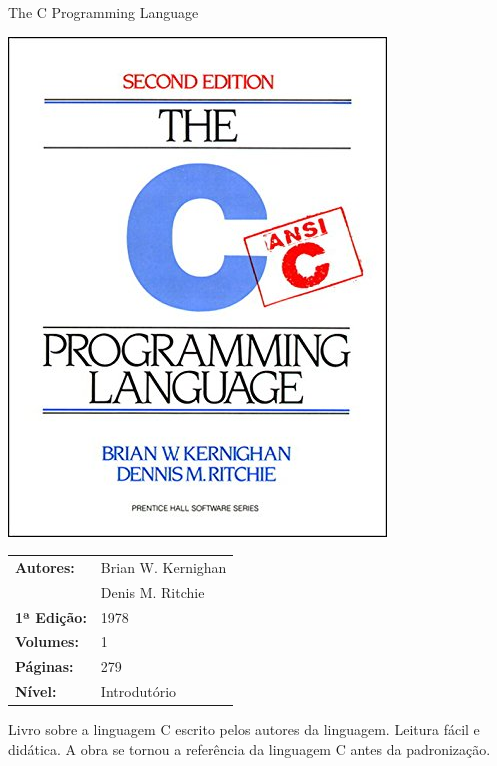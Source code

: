 \begin{frame}[fragile]{The C Programming Language}

    \begin{minipage}{0.4\textwidth}
        \includegraphics[scale=0.25]{kr.jpg}
    \end{minipage}
    \begin{minipage}{0.5\textwidth}
        \begin{small}
            \begin{tabularx}{0.95\textwidth}{lX}
                \textbf{Autores:} & Brian W. Kernighan \\
                & Denis M. Ritchie \\
                \textbf{1ª Edição:} & 1978 \\
                \textbf{Volumes:} & 1 \\
                \textbf{Páginas:} & 279 \\
                \textbf{Nível:} & Introdutório \\
            \end{tabularx}
        \end{small}
    \end{minipage}

    \vspace{0.2in} 

    Livro sobre a linguagem C escrito pelos autores da linguagem. Leitura fácil e
    didática. A obra se tornou a referência da linguagem C antes da padronização.

\end{frame}

